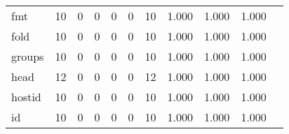 \begin{longtable}{lp{1.20cm}p{1.20cm}p{1.20cm}p{1.20cm}p{1.20cm}p{1.20cm}p{1.20cm}p{1.20cm}p{1.20cm}p{1.20cm}}
fmt       &                                    10 &                                                  0 &                                                  0 &                                                  0 &                                                  0 &                                                 10 &                                         1.000 &                                              1.000 &                                              1.000 \\
fold      &                                    10 &                                                  0 &                                                  0 &                                                  0 &                                                  0 &                                                 10 &                                         1.000 &                                              1.000 &                                              1.000 \\
groups    &                                    10 &                                                  0 &                                                  0 &                                                  0 &                                                  0 &                                                 10 &                                         1.000 &                                              1.000 &                                              1.000 \\
head      &                                    12 &                                                  0 &                                                  0 &                                                  0 &                                                  0 &                                                 12 &                                         1.000 &                                              1.000 &                                              1.000 \\
hostid    &                                    10 &                                                  0 &                                                  0 &                                                  0 &                                                  0 &                                                 10 &                                         1.000 &                                              1.000 &                                              1.000 \\
id        &                                    10 &                                                  0 &                                                  0 &                                                  0 &                                                  0 &                                                 10 &                                         1.000 &                                              1.000 &                                              1.000 \\

\end{longtable}
